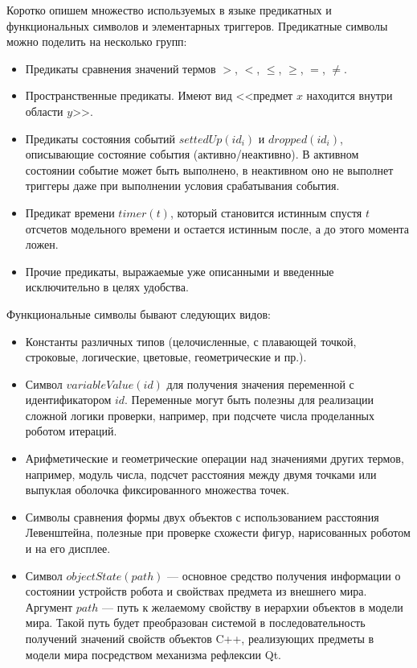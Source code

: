 \documentclass[a5paper]{article}
\begin{document}
Коротко опишем множество используемых в языке предикатных и функциональных символов и элементарных триггеров. Предикатные символы можно поделить на несколько групп:
\begin{itemize}
    \item Предикаты сравнения значений термов $>$, $<$, $\leq$, $\geq$, $=$, $\neq$.
    \item Пространственные предикаты. Имеют вид <<предмет $x$ находится внутри области $y$>>.
    \item Предикаты состояния событий $settedUp(id_i)$ и $dropped(id_i)$, описывающие состояние события 
            (активно/неактивно). В активном состоянии событие может быть выполнено, в неактивном оно не выполнет триггеры даже при выполнении условия срабатывания события.
    \item Предикат времени $timer(t)$, который становится истинным спустя $t$ отсчетов модельного времени и остается истинным после, а до этого момента ложен.
    \item Прочие предикаты, выражаемые уже описанными и введенные исключительно в целях удобства.
\end{itemize}

Функциональные символы бывают следующих видов:
\begin{itemize}
    \item Константы различных типов (целочисленные, с плавающей точкой, строковые, логические, цветовые, геометрические и пр.).
    \item Символ $variableValue(id)$ для получения значения переменной с идентификатором $id$. Переменные могут быть полезны для реализации сложной логики проверки, например, при подсчете числа проделанных роботом итераций.
    \item Арифметические и геометрические операции над значениями других термов, например, модуль числа, подсчет расстояния между двумя точками или выпуклая оболочка фиксированного множества точек.
    \item Символы сравнения формы двух объектов с использованием расстояния Левенштейна, полезные при проверке схожести фигур, нарисованных роботом и на его дисплее.
    \item Символ $objectState(path)$ --- основное средство получения информации о состоянии устройств робота и свойствах предмета из внешнего мира. Аргумент $path$ --- путь к желаемому свойству в иерархии объектов в модели мира. Такой путь будет преобразован системой в последовательность получений значений свойств объектов C++, реализующих предметы в модели мира посредством механизма рефлексии Qt.
\end{itemize}
\end{document}
